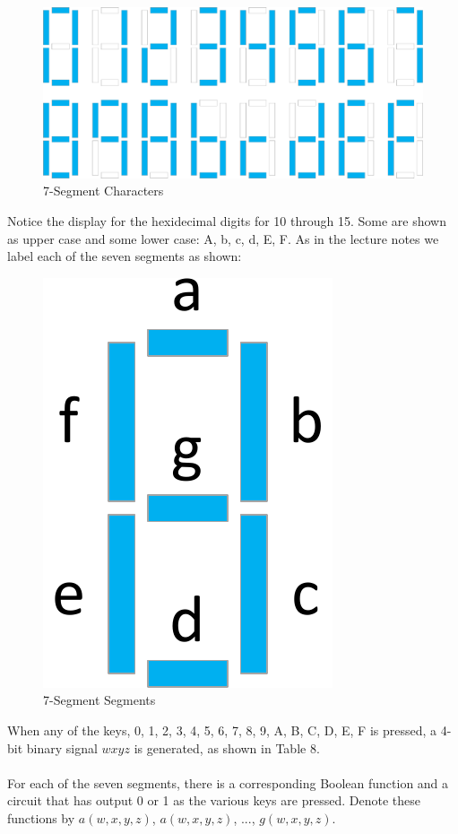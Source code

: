 \documentclass[12pt,a4paper]{article}
\begin{document}
\begin{figure}[h]
\centering
\caption{7-Segment Characters}
\includegraphics[scale=0.5]{./../img/7-seg-chars.pdf}
\end{figure}
Notice the display for the hexidecimal digits for 10 through 15. Some are shown as upper case and some lower case: A, b, c, d, E, F. As in the lecture notes we label each of the seven segments as shown:

\begin{figure}[h]
\centering
\caption{7-Segment Segments}
\includegraphics[scale=0.5]{./../img/7-seg-segments.pdf}
\end{figure}
When any of the keys, 0, 1, 2, 3, 4, 5, 6, 7, 8, 9, A, B, C, D, E, F is pressed, a 4-bit binary signal $wxyz$ is generated, as shown in Table 8.
\\
\\
For each of the seven segments, there is a corresponding Boolean function and a circuit that has output 0 or 1 as the various keys are pressed. Denote these functions by $a(w,x,y,z)$, $a(w,x,y,z)$, ..., $g(w,x,y,z)$.
\end{document}

